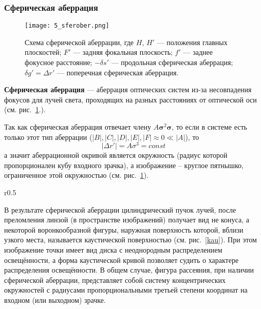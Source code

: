  	\subsubsection{Сферическая аберрация}
 	\begin{figure}[H]
 	\begin{center}
 	\texttt{[image: 5\_sferober.png]}
 	\caption{Схема сферической аберрации, где
 		$H$, $H'$ — положения главных плоскостей;
 		$F'$  — задняя фокальная плоскость;
 		$f'$  — заднее фокусное расстояние;
 		$-\delta s'$  — продольная сферическая аберрация;
 		$\delta g' = \Delta r'$  — поперечная сферическая аберрация.}
 	\label{p1}
 	\end{center}
 	\end{figure}
 \begin{definition}
 	\textbf{Сферическая аберрация} — аберрация оптических систем из-за несовпадения фокусов для лучей света, проходящих на разных расстояниях от оптической оси (см. рис.~\ref{p1}.).
 \end{definition}
Так как сферическая аберрация отвечает члену $A\bm{\sigma}^{2}\bm{\sigma}$, то если в системе есть только этот тип аберрации ($|B|,|C|,|D|,|E|,|F|\approx0\ll |A|$), то
\begin{equation*}
|\Delta r'| = A\sigma^{3} = const
\end{equation*} 
а значит аберрационной окривой является окружность (радиус которой пропорционален кубу входного зрачка), а изображение -- круглое пятнышко, ограниченное этой окружностью (см. рис.~\ref{p1}).

\begin{wrapfigure}{r}{0.5\textwidth}
	\caption{Каустика -- огибающая лучей от фронта}
	\label{kau}
\end{wrapfigure}
В результате сферической аберрации цилиндрический пучок лучей, после преломления линзой (в пространстве изображений) получает вид не конуса, а некоторой воронкообразной фигуры, наружная поверхность которой, вблизи узкого места, называется каустической поверхностью (см. рис.~\ref{kau}). При этом изображение точки имеет вид диска с неоднородным распределением освещённости, а форма каустической кривой позволяет судить о характере распределения освещённости. В общем случае, фигура рассеяния, при наличии сферической аберрации, представляет собой систему концентрических окружностей с радиусами пропорциональными третьей степени координат на входном (или выходном) зрачке.

